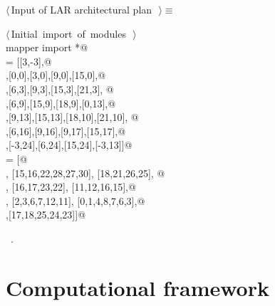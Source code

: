 \documentclass[11pt,oneside]{article}	%
\begin{document}
\begin{flushleft} \small \label{scrap42}
$\langle\,$Input of LAR architectural plan\nobreak\ {\footnotesize {}}$\,\rangle\equiv$
\vspace{-1ex}
\begin{list}{}{} \item
\mbox{}\verb@@\hbox{$\langle\,$Initial import of modules\nobreak\ {\footnotesize {}}$\,\rangle$}\verb@@\\
\mbox{}\verb@from mapper import *@\\
\mbox{}\verb@V = [[3,-3],@\\
\mbox{}\verb@[9,-3],[0,0],[3,0],[9,0],[15,0],@\\
\mbox{}\verb@[3,3],[6,3],[9,3],[15,3],[21,3], @\\
\mbox{}\verb@[0,9],[6,9],[15,9],[18,9],[0,13],@\\
\mbox{}\verb@[6,13],[9,13],[15,13],[18,10],[21,10], @\\
\mbox{}\verb@[18,13],[6,16],[9,16],[9,17],[15,17],@\\
\mbox{}\verb@[18,17],[-3,24],[6,24],[15,24],[-3,13]]@\\
\mbox{}\verb@FV = [@\\
\mbox{}\verb@[22,23,24,25,29,28], [15,16,22,28,27,30], [18,21,26,25], @\\
\mbox{}\verb@[13,14,19,21,18], [16,17,23,22], [11,12,16,15],@\\
\mbox{}\verb@[9,10,20,19,14,13], [2,3,6,7,12,11], [0,1,4,8,7,6,3],@\\
\mbox{}\verb@[4,5,9,13,18,17,16,12,7,8],[17,18,25,24,23]]@\\
\mbox{}\verb@@{\NWsep}
\end{list}
\vspace{-1ex}
\footnotesize\addtolength{\baselineskip}{-1ex}
\begin{list}{}{\setlength{\itemsep}{-\parsep}\setlength{\itemindent}{-\leftmargin}}
\item \NWtxtMacroRefIn\ .
\end{list}
\end{flushleft}



\section{Computational framework}
\end{document}
